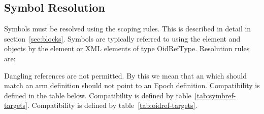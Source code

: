 \subsection{Symbol Resolution}
\label{sec:ref-symbol-resolution}

Symbols must be resolved using the scoping rules. This is described in
detail in section~\ref{sec:blocks}. Symbols are typically referred to
using the  element and objects by the  element
or XML elements of type OidRefType. Resolution rules are:

\begin{valrules}
Dangling references are not permitted.
 By this we mean that an 
which should match an arm definition should not point to an Epoch
definition. Compatibility is defined in the table below.
 Compatibility is
defined by table~\ref{tab:symbref-targets}.  
 Compatibility is
defined by table~\ref{tab:oidref-targets}.  
\end{valrules}


